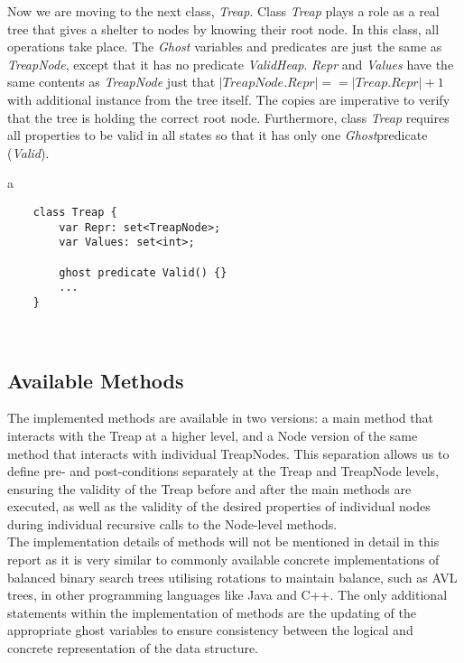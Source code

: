 Now we are moving to the next class, \textit{Treap}. Class \textit{Treap} plays a role as a real tree that gives a shelter to nodes by knowing their root node. In this class, all operations take place. The \textit{Ghost} variables and predicates are just the same as \textit{TreapNode}, except that it has no predicate \textit{ValidHeap}. \textit{Repr} and \textit{Values} have the same contents as \textit{TreapNode} just that $\vert TreapNode.Repr \vert == \vert Treap.Repr \vert + 1$ with additional instance from the tree itself. The copies are imperative to verify that the tree is holding the correct root node. Furthermore, class \textit{Treap} requires all properties to be valid in all states so that it has only one \textit{Ghost}predicate (\textit{Valid}).\\

\begin{tabular}{a}
    \begin{lstlisting}
    class Treap {
        var Repr: set<TreapNode>;
        var Values: set<int>;
    
        ghost predicate Valid() {}
        ...
    }
    \end{lstlisting}
    \end{tabular}\\

\subsection{Available Methods}
The implemented methods are available in two versions: a main method that interacts with the Treap at a higher level, and a Node version of the same method that interacts with individual TreapNodes. This separation allows us to define pre- and post-conditions separately at the Treap and TreapNode levels, ensuring the validity of the Treap before and after the main methods are executed, as well as the validity of the desired properties of individual nodes during individual recursive calls to the Node-level methods.\\

The implementation details of methods will not be mentioned in detail in this report as it is very similar to commonly available concrete implementations of balanced binary search trees utilising rotations to maintain balance, such as AVL trees, in other programming languages like Java and C++. The only additional statements within the implementation of methods are the updating of the appropriate ghost variables to ensure consistency between the logical and concrete representation of the data structure. \\

